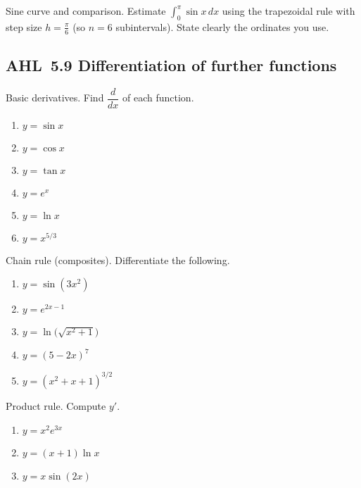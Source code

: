 \documentclass[11pt]{article}
\def\textbf#1{#1}%
\newcommand{\tocsubsection}[1]{\subsection{#1}}
\newcounter{question}
\begin{document}
\begin{question}
\textbf{Sine curve and comparison.}
Estimate \(\displaystyle \int_{0}^{\pi} \sin x\,dx\) using the trapezoidal rule with step size
\(h=\frac{\pi}{6}\) (so \(n=6\) subintervals).
State clearly the ordinates you use.
\end{question}


\tocsubsection{AHL 5.9 \; Differentiation of further functions}


\begin{question}
\textbf{Basic derivatives.} Find $\dfrac{d}{dx}$ of each function.
\begin{enumerate}
  \item $y=\sin x$
  \item $y=\cos x$
  \item $y=\tan x$
  \item $y=e^{x}$
  \item $y=\ln x$
  \item $y=x^{5/3}$
\end{enumerate}
\end{question}

\begin{question}
\textbf{Chain rule (composites).} Differentiate the following.
\begin{enumerate}
  \item $y=\sin(3x^{2})$
  \item $y=e^{2x-1}$
  \item $y=\ln\!\big(\sqrt{x^{2}+1}\big)$
  \item $y=(5-2x)^{7}$
  \item $y=(x^{2}+x+1)^{3/2}$
\end{enumerate}
\end{question}

\begin{question}
\textbf{Product rule.} Compute $y'$.
\begin{enumerate}
  \item $y=x^{2}e^{3x}$
  \item $y=(x+1)\ln x$
  \item $y=x\sin(2x)$
\end{enumerate}
\end{question}
\end{document}
